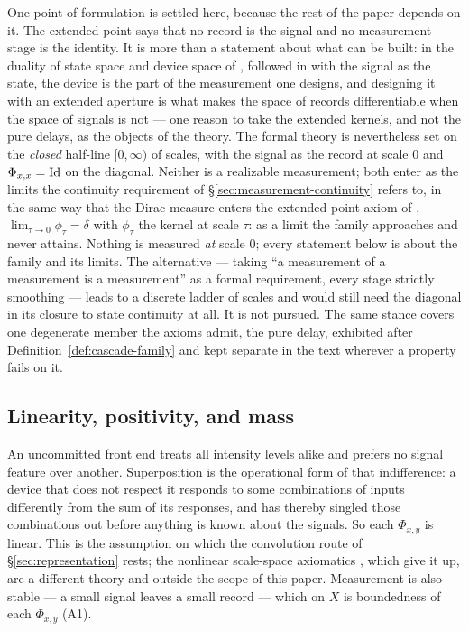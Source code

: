 One point of formulation is settled here, because the rest of the paper depends on it.
The extended point says that no record is the signal and no measurement stage is the
identity. It is more than a statement about what can be built: in the duality of state space and
device space of , followed in 
with the signal as the state, the device is the part of the measurement one designs, and
designing it with an extended aperture is what makes the space of records differentiable
when the space of signals is not --- one reason to take the extended kernels, and not
the pure delays, as the objects of the theory. The formal theory is nevertheless set on the \emph{closed} half-line
$[0,\infty)$ of scales, with the signal as the record at scale $0$ and
$\Phi_{x,x} = \mathrm{Id}$ on the diagonal. Neither is a realizable measurement; both enter as
the limits the continuity requirement of \S\ref{sec:measurement-continuity} refers to,
in the same way that the Dirac measure enters the extended point axiom of
, $\lim_{\tau \to 0}\phi_\tau = \delta$ with $\phi_\tau$
the kernel at scale $\tau$: as a limit the family approaches and never attains. Nothing
is measured \emph{at} scale $0$; every statement below is about the family and its
limits. The alternative --- taking ``a measurement of a measurement is a measurement''
as a formal requirement, every stage strictly smoothing --- leads to a discrete ladder of
scales and would still need the diagonal in its closure to state continuity at all. It is
not pursued. The same stance covers one degenerate member the axioms admit, the pure
delay, exhibited after Definition~\ref{def:cascade-family} and kept separate in the text
wherever a property fails on it.

\subsection{Linearity, positivity, and mass}\label{sec:measurement-linearity}

An uncommitted front end treats all intensity levels alike and prefers no signal feature
over another. Superposition is the operational form of that indifference: a device that
does not respect it responds to some combinations of inputs differently from the sum of
its responses, and has thereby singled those combinations out before anything is known
about the signals. So each $\Phi_{x,y}$ is linear. This is the assumption on which the
convolution route of \S\ref{sec:representation} rests; the nonlinear scale-space
axiomatics , which give it up, are a different theory and
outside the scope of this paper. Measurement is also stable --- a small signal leaves a small record --- which on $X$ is
boundedness of each $\Phi_{x,y}$ (A1).

